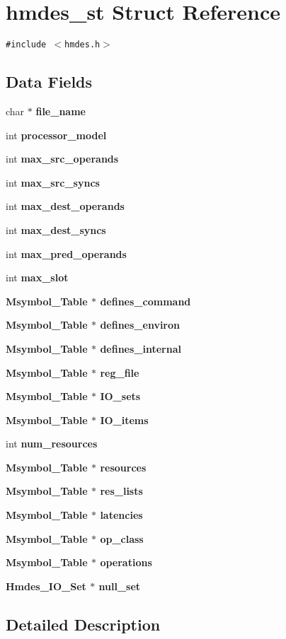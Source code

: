 \section{hmdes\_\-st Struct Reference}
\label{structhmdes__st}
{\tt \#include $<$hmdes.h$>$}

\subsection*{Data Fields}
\begin{CompactItemize}
\item 
char $\ast$ \bf{file\_\-name}
\item 
int \bf{processor\_\-model}
\item 
int \bf{max\_\-src\_\-operands}
\item 
int \bf{max\_\-src\_\-syncs}
\item 
int \bf{max\_\-dest\_\-operands}
\item 
int \bf{max\_\-dest\_\-syncs}
\item 
int \bf{max\_\-pred\_\-operands}
\item 
int \bf{max\_\-slot}
\item 
\bf{Msymbol\_\-Table} $\ast$ \bf{defines\_\-command}
\item 
\bf{Msymbol\_\-Table} $\ast$ \bf{defines\_\-environ}
\item 
\bf{Msymbol\_\-Table} $\ast$ \bf{defines\_\-internal}
\item 
\bf{Msymbol\_\-Table} $\ast$ \bf{reg\_\-file}
\item 
\bf{Msymbol\_\-Table} $\ast$ \bf{IO\_\-sets}
\item 
\bf{Msymbol\_\-Table} $\ast$ \bf{IO\_\-items}
\item 
int \bf{num\_\-resources}
\item 
\bf{Msymbol\_\-Table} $\ast$ \bf{resources}
\item 
\bf{Msymbol\_\-Table} $\ast$ \bf{res\_\-lists}
\item 
\bf{Msymbol\_\-Table} $\ast$ \bf{latencies}
\item 
\bf{Msymbol\_\-Table} $\ast$ \bf{op\_\-class}
\item 
\bf{Msymbol\_\-Table} $\ast$ \bf{operations}
\item 
\bf{Hmdes\_\-IO\_\-Set} $\ast$ \bf{null\_\-set}
\end{CompactItemize}


\subsection{Detailed Description}




